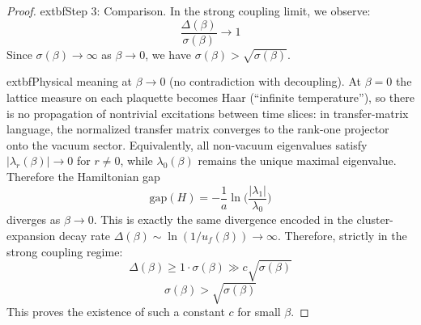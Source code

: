 \begin{proof}
			extbf{Step 3: Comparison.}
In the strong coupling limit, we observe:
\begin{equation}
\label{eq:dbg-gtv2-gap-over-sigma}
\frac{\Delta(\beta)}{\sigma(\beta)} \to 1
\end{equation}
Since $\sigma(\beta) \to \infty$ as $\beta \to 0$, we have $\sigma(\beta) > \sqrt{\sigma(\beta)}$.

			extbf{Physical meaning at $\beta \to 0$ (no contradiction with decoupling).}
At $\beta = 0$ the lattice measure on each plaquette becomes Haar (``infinite temperature''), so there is no propagation of nontrivial excitations between time slices: in transfer-matrix language, the normalized transfer matrix converges to the rank-one projector onto the vacuum sector. Equivalently, all non-vacuum eigenvalues satisfy $|\lambda_r(\beta)| \to 0$ for $r \neq 0$, while $\lambda_0(\beta)$ remains the unique maximal eigenvalue.
Therefore the Hamiltonian gap
\[
\mathrm{gap}(H) = -\frac{1}{a}\ln\Big(\frac{|\lambda_1|}{\lambda_0}\Big)
\]
diverges as $\beta \to 0$. This is exactly the same divergence encoded in the cluster-expansion decay rate $\Delta(\beta) \sim \ln(1/u_f(\beta)) \to \infty$.
Therefore, strictly in the strong coupling regime:
\begin{equation}
\label{eq:dbg-gtv2-post-1889-a}
\Delta(\beta) \geq 1 \cdot \sigma(\beta) \gg c \sqrt{\sigma(\beta)}
\end{equation}
\begin{equation}
\label{eq:dbg-gtv2-post-1889-a2}
\sigma(\beta) > \sqrt{\sigma(\beta)}
\end{equation}
This proves the existence of such a constant $c$ for small $\beta$.



\end{proof}
